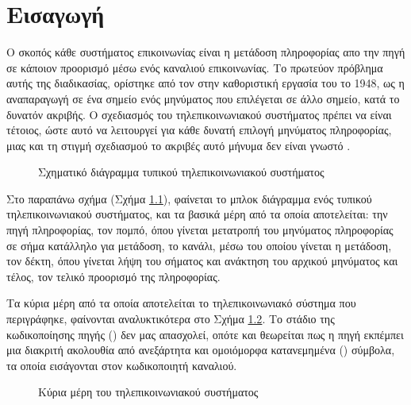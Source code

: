 \chapter{Εισαγωγή}
Ο σκοπός κάθε συστήματος επικοινωνίας είναι η μετάδοση πληροφορίας απο την πηγή σε κάποιον προορισμό μέσω ενός καναλιού επικοινωνίας. Το πρωτεύον πρόβλημα αυτής της διαδικασίας, ορίστηκε από τον  στην καθοριστική εργασία του το 1948, ως η αναπαραγωγή σε ένα σημείο ενός μηνύματος που επιλέγεται σε άλλο σημείο, κατά το δυνατόν ακριβής. Ο σχεδιασμός του τηλεπικοινωνιακού συστήματος πρέπει να είναι τέτοιος, ώστε αυτό να λειτουργεί για κάθε δυνατή επιλογή μηνύματος πληροφορίας, μιας και τη στιγμή σχεδιασμού το ακριβές αυτό μήνυμα δεν είναι γνωστό \cite{shannon1948mathematical}.

\begin{figure}[h]
\caption{Σχηματικό διάγραμμα τυπικού τηλεπικοινωνιακού συστήματος}
\label{fig:telecom system}
\end{figure}

Στο παραπάνω σχήμα (Σχήμα \ref{fig:telecom system}), φαίνεται το μπλοκ διάγραμμα ενός τυπικού τηλεπικοινωνιακού συστήματος, και τα βασικά μέρη από τα οποία αποτελείται: την πηγή πληροφορίας, τον πομπό, όπου γίνεται μετατροπή του μηνύματος πληροφορίας σε σήμα κατάλληλο για μετάδοση, το κανάλι, μέσω του οποίου γίνεται η μετάδοση, τον δέκτη, όπου γίνεται λήψη του σήματος και ανάκτηση του αρχικού μηνύματος και τέλος, τον τελικό προορισμό της πληροφορίας.

Tα κύρια μέρη από τα οποία αποτελείται το τηλεπικοινωνιακό σύστημα που περιγράφηκε, φαίνονται αναλυκτικότερα στο Σχήμα \ref{fig:telecom system 2}. Tο στάδιο της κωδικοποίησης πηγής () δεν μας απασχολεί, οπότε και θεωρείται πως η πηγή εκπέμπει μια διακριτή ακολουθία από ανεξάρτητα και ομοιόμορφα κατανεμημένα () σύμβολα, τα οποία εισάγονται στον κωδικοποιητή καναλιού.

\begin{figure}[h]
\caption{Κύρια μέρη του τηλεπικοινωνιακού συστήματος}
\label{fig:telecom system 2}
\end{figure}

